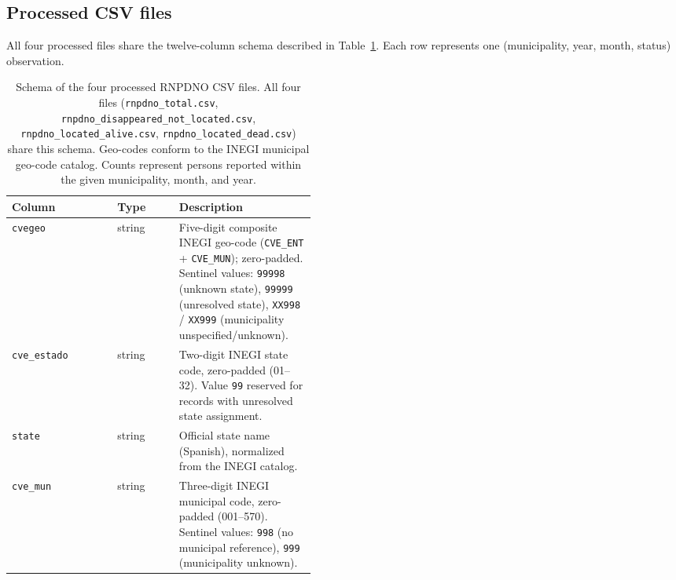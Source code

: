 \documentclass[3p]{elsarticle}
\begin{document}
\subsection*{Processed CSV files}

All four processed files share the twelve-column schema described in
Table~\ref{tab:schema}.
Each row represents one (municipality, year, month, status) observation.

\begin{table}[ht]
  \centering
  \caption{Schema of the four processed RNPDNO CSV files.
    All four files (\texttt{rnpdno\_total.csv},
    \texttt{rnpdno\_disappeared\_not\_located.csv},
    \texttt{rnpdno\_located\_alive.csv},
    \texttt{rnpdno\_located\_dead.csv})
    share this schema.
    Geo-codes conform to the INEGI municipal geo-code catalog.
    Counts represent persons reported within the given
    municipality, month, and year.}
  \label{tab:schema}
  \renewcommand{\arraystretch}{1.2}
  \begin{tabular}{llp{0.45\linewidth}}
    \toprule
    Column & Type & Description \\
    \midrule
    \texttt{cvegeo}     & string  & Five-digit composite INEGI geo-code
                                    (\texttt{CVE\_ENT} + \texttt{CVE\_MUN});
                                    zero-padded.
                                    Sentinel values: \texttt{99998}
                                    (unknown state),
                                    \texttt{99999} (unresolved state),
                                    \texttt{XX998} / \texttt{XX999}
                                    (municipality unspecified/unknown). \\
    \texttt{cve\_estado}& string  & Two-digit INEGI state code,
                                    zero-padded (01--32).
                                    Value \texttt{99} reserved for
                                    records with unresolved
                                    state assignment. \\
    \texttt{state}      & string  & Official state name (Spanish),
                                    normalized from the INEGI catalog. \\
    \texttt{cve\_mun}   & string  & Three-digit INEGI municipal code,
                                    zero-padded (001--570).
                                    Sentinel values: \texttt{998}
                                    (no municipal reference),
                                    \texttt{999} (municipality unknown). \\

\end{tabular}
\end{table}
\end{document}

